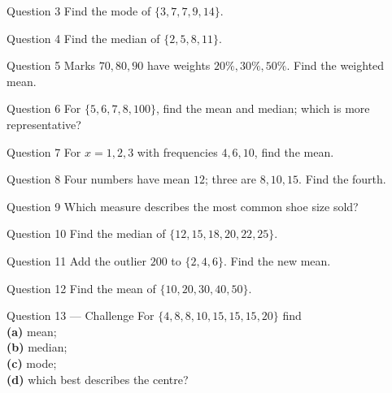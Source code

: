 \documentclass[11pt]{article}
\begin{document}
\begin{qbox}{Question 3}
Find the mode of $\{3,7,7,9,14\}$.\workspace{2.4cm}
\end{qbox}

\begin{qbox}{Question 4}
Find the median of $\{2,5,8,11\}$.\workspace{2.4cm}
\end{qbox}

\begin{qbox}{Question 5}
Marks $70,80,90$ have weights $20\%,30\%,50\%$. Find the weighted mean.\workspace{2.4cm}
\end{qbox}

\begin{qbox}{Question 6}
For $\{5,6,7,8,100\}$, find the mean and median; which is more representative?\workspace{2.4cm}
\end{qbox}

\begin{qbox}{Question 7}
For $x=1,2,3$ with frequencies $4,6,10$, find the mean.\workspace{2.4cm}
\end{qbox}

\begin{qbox}{Question 8}
Four numbers have mean $12$; three are $8,10,15$. Find the fourth.\workspace{2.4cm}
\end{qbox}

\begin{qbox}{Question 9}
Which measure describes the most common shoe size sold?\workspace{2.4cm}
\end{qbox}

\begin{qbox}{Question 10}
Find the median of $\{12,15,18,20,22,25\}$.\workspace{2.4cm}
\end{qbox}

\begin{qbox}{Question 11}
Add the outlier $200$ to $\{2,4,6\}$. Find the new mean.\workspace{2.4cm}
\end{qbox}

\begin{qbox}{Question 12}
Find the mean of $\{10,20,30,40,50\}$.\workspace{2.4cm}
\end{qbox}

\begin{qbox}{Question 13 --- Challenge}
For $\{4,8,8,10,15,15,15,20\}$ find \\ \textbf{(a)} mean; \\ \textbf{(b)} median; \\ \textbf{(c)} mode; \\ \textbf{(d)} which best describes the centre?\workspace{3cm}
\end{qbox}
\end{document}
